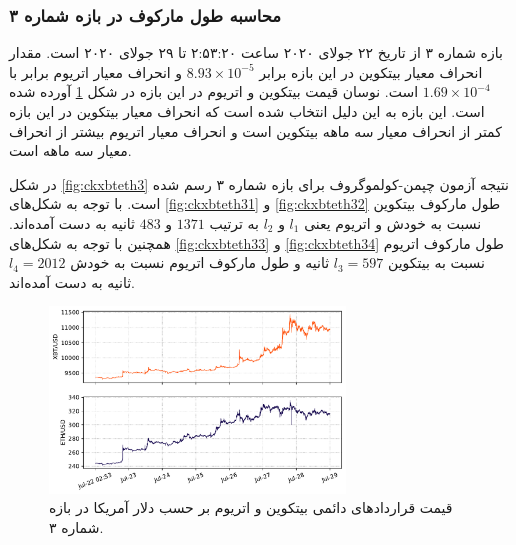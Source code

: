 \subsubsection{محاسبه طول مارکوف در بازه شماره ۳}
بازه شماره ۳ از تاریخ ۲۲ جولای ۲۰۲۰ ساعت ۲:۵۳:۲۰ تا ۲۹ جولای ۲۰۲۰ است. 
مقدار انحراف معیار بیتکوین در این بازه برابر $8.93 \times 10^{-5}$ و انحراف معیار اتریوم برابر با $1.69 \times 10^{-4}$ 
است. نوسان قیمت بیتکوین و اتریوم در این بازه در شکل \ref{fig:XBTETH3} آورده شده است. این بازه به این دلیل انتخاب شده است که انحراف معیار بیتکوین 
در این بازه کمتر از انحراف معیار سه ماهه بیتکوین است و انحراف معیار اتریوم بیشتر از انحراف معیار سه ماهه است.

در شکل \ref{fig:ckxbteth3} نتیجه آزمون چپمن-کولموگروف برای بازه شماره ۳ رسم شده است. 
با توجه به شکل‌های \ref{fig:ckxbteth31} و \ref{fig:ckxbteth32} طول مارکوف بیتکوین نسبت به خودش و 
اتریوم یعنی $l_1$ و $l_2$ به ترتیب $1371$ و $483$ ثانیه به دست آمده‌اند. همچنین با توجه به شکل‌های \ref{fig:ckxbteth33} و 
\ref{fig:ckxbteth34} طول مارکوف اتریوم نسبت به بیتکوین $l_3 = 597$ ثانیه و طول مارکوف اتریوم نسبت به خودش 
$l_4=2012$ ثانیه به دست آمده‌اند.

\begin{figure}[H]
  \centering
  \includegraphics[width=0.7\textwidth]{images/xbteth3.pdf}
  \caption{قیمت قراردادهای دائمی بیتکوین و اتریوم بر حسب دلار آمریکا در بازه شماره ۳.}\label{fig:XBTETH3}
\end{figure}

